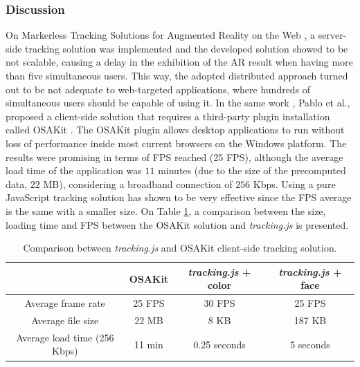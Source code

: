 \subsubsection{Discussion} %
\label{subsub:evaluation:results:js_tracking_solution:description}

On Markerless Tracking Solutions for Augmented Reality on the Web \cite{Pablo2013}, a server-side tracking solution was implemented and the developed solution showed to be not scalable, causing a delay in the exhibition of the AR result when having more than five simultaneous users. This way, the adopted distributed approach turned out to be not adequate to web-targeted applications, where hundreds of simultaneous users should be capable of using it. In the same work \cite{Pablo2013}, Pablo et al., proposed a client-side solution that requires a third-party plugin installation called OSAKit \cite{OSAKit2013}. The OSAKit plugin allows desktop applications to run without loss of performance inside most current browsers on the Windows platform. The results were promising in terms of FPS reached (25 FPS), although the average load time of the application was $11$ minutes (due to the size of the precomputed data, $22$ MB), considering a broadband connection of $256$ Kbps. Using a pure JavaScript tracking solution has shown to be very effective since the FPS average is the same with a smaller size. On Table \ref{table:comparison_with_osakit}, a comparison between the size, loading time and FPS between the OSAKit solution and \textit{tracking.js} is presented.

\begin{table}[!htb]
    \centering %
    \begin{tabular}{|c|c|c|c|}
        \hline
        & OSAKit & \textit{tracking.js} + color & \textit{tracking.js} + face \\
        \hline
        Average frame rate & 25 FPS & 30 FPS & 25 FPS\\
        \hline
        Average file size & 22 MB & 8 KB & 187 KB\\
        \hline
        Average load time (256 Kbps) & 11 min & 0.25 seconds & 5 seconds\\
        \hline
    \end{tabular}
    \caption{Comparison between \textit{tracking.js} and OSAKit client-side tracking solution.}
    \label{table:comparison_with_osakit}
\end{table}



